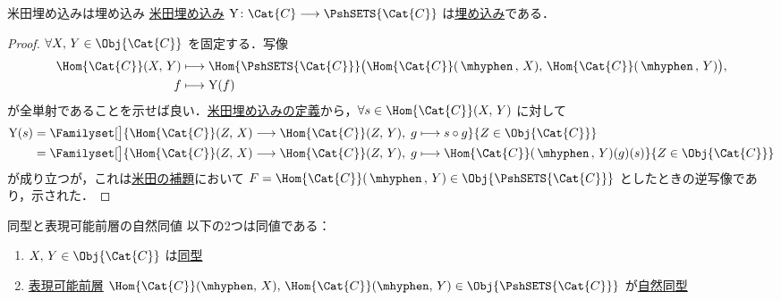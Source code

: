 \documentclass[TQFT_main]{subfiles}
\begin{document}
\begin{myprop}[label=prop:Yoneda]{米田埋め込みは埋め込み}
    \hyperref[def:representable]{米田埋め込み} $\mathrm{Y} \colon \Cat{C} \lto \PshSETS{\Cat{C}}$ は\hyperref[def:faithful]{埋め込み}である．
\end{myprop}

\begin{proof}
    $\forall X,\, Y \in \Obj{\Cat{C}}$ を固定する．写像
    \begin{align}
        \Hom{\Cat{C}} (X,\, Y) &\lmto \Hom{\PshSETS{\Cat{C}}} \bigl( \Hom{\Cat{C}}(\, \mhyphen \, , \, X),\, \Hom{\Cat{C}}(\, \mhyphen \, , \, Y) \bigr),\\ 
        f &\lmto \mathrm{Y}(f)
    \end{align}
    が全単射であることを示せば良い．\hyperref[def:representable]{米田埋め込みの定義}から，$\forall s \in \Hom{\Cat{C}} (X,\, Y)$ に対して
    \begin{align}
        \mathrm{Y}(s) 
        &= \Familyset[\big]{\Hom{\Cat{C}}(Z,\, X) \lto \Hom{\Cat{C}}(Z,\, Y),\; g \lmto s \circ g}{Z \in \Obj{\Cat{C}}} \\
        &= \Familyset[\big]{\Hom{\Cat{C}}(Z,\, X) \lto \Hom{\Cat{C}}(Z,\, Y),\; g \lmto \Hom{\Cat{C}}(\, \mhyphen\, ,\, Y)(g)(s)}{Z \in \Obj{\Cat{C}}}
    \end{align}
    が成り立つが，これは\hyperref[lem:Yoneda]{米田の補題}において $F = \Hom{\Cat{C}}(\, \mhyphen\,,\, Y) \in \Obj{\PshSETS{\Cat{C}}}$ としたときの逆写像であり，示された．
\end{proof}

\begin{mycol}[label=col:Yoneda]{同型と表現可能前層の自然同値}
    以下の2つは同値である：
    \begin{enumerate}
        \item $X,\, Y \in \Obj{\Cat{C}}$ は\hyperref[def:iso]{同型}
        \item \hyperref[def:representable]{表現可能前層} $\Hom{\Cat{C}}(\mhyphen,\, X),\, \Hom{\Cat{C}}(\mhyphen,\, Y) \in \Obj{\PshSETS{\Cat{C}}}$ が\hyperref[def:nat]{自然同型}
    \end{enumerate}
\end{mycol}
\end{document}
